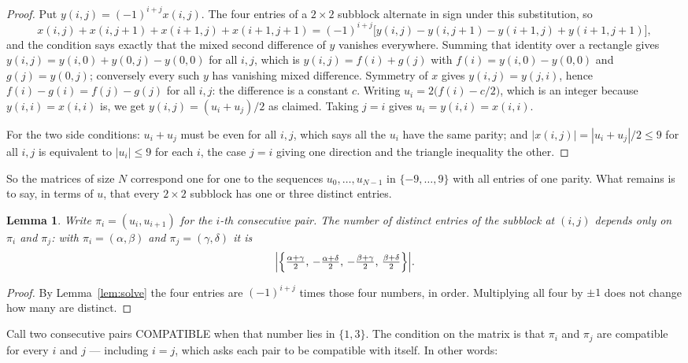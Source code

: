 \documentclass[11pt,a4paper]{article}
\theoremstyle{plain}
\newtheorem{lemma}[theorem]{Lemma}
\theoremstyle{definition}
\begin{document}
\begin{proof}
Put $y(i,j)=(-1)^{i+j}x(i,j)$. The four entries of a $2\times2$ subblock alternate in sign
under this substitution, so
\[
x(i,j)+x(i,j{+}1)+x(i{+}1,j)+x(i{+}1,j{+}1)
=(-1)^{i+j}\bigl[y(i,j)-y(i,j{+}1)-y(i{+}1,j)+y(i{+}1,j{+}1)\bigr],
\]
and the condition says exactly that the mixed second difference of $y$ vanishes everywhere.
Summing that identity over a rectangle gives
$y(i,j)=y(i,0)+y(0,j)-y(0,0)$ for all $i,j$, which is $y(i,j)=f(i)+g(j)$ with
$f(i)=y(i,0)-y(0,0)$ and $g(j)=y(0,j)$; conversely every such $y$ has vanishing mixed
difference. Symmetry of $x$ gives $y(i,j)=y(j,i)$, hence $f(i)-g(i)=f(j)-g(j)$ for all $i,j$:
the difference is a constant $c$. Writing $u_i=2\bigl(f(i)-c/2\bigr)$, which is an integer
because $y(i,i)=x(i,i)$ is, we get $y(i,j)=(u_i+u_j)/2$ as claimed. Taking $j=i$ gives
$u_i=y(i,i)=x(i,i)$.

For the two side conditions: $u_i+u_j$ must be even for all $i,j$, which says all the $u_i$ have
the same parity; and $|x(i,j)|=|u_i+u_j|/2\le9$ for all $i,j$ is equivalent to $|u_i|\le9$
for each $i$, the case $j=i$ giving one direction and the triangle inequality the other.
\end{proof}

So the matrices of size $N$ correspond one for one to the sequences $u_0,\dots,u_{N-1}$ in
$\{-9,\dots,9\}$ with all entries of one parity. What remains is to say, in terms of $u$,
that every $2\times2$ subblock has one or three distinct entries.

\begin{lemma}\label{lem:block}
Write $\pi_i=(u_i,u_{i+1})$ for the $i$-th consecutive pair. The number of distinct entries of
the subblock at $(i,j)$ depends only on $\pi_i$ and $\pi_j$: with $\pi_i=(\alpha,\beta)$ and
$\pi_j=(\gamma,\delta)$ it is
\[
\Bigl|\Bigl\{\tfrac{\alpha+\gamma}{2},\,-\tfrac{\alpha+\delta}{2},\,
-\tfrac{\beta+\gamma}{2},\,\tfrac{\beta+\delta}{2}\Bigr\}\Bigr| .
\]
\end{lemma}

\begin{proof}
By Lemma~\ref{lem:solve} the four entries are $(-1)^{i+j}$ times those four numbers, in
order. Multiplying all four by $\pm1$ does not change how many are distinct.
\end{proof}

Call two consecutive pairs COMPATIBLE when that number lies in $\{1,3\}$. The condition on the
matrix is that $\pi_i$ and $\pi_j$ are compatible for every $i$ and $j$ --- including $i=j$,
which asks each pair to be compatible with itself. In other words:
\end{document}
